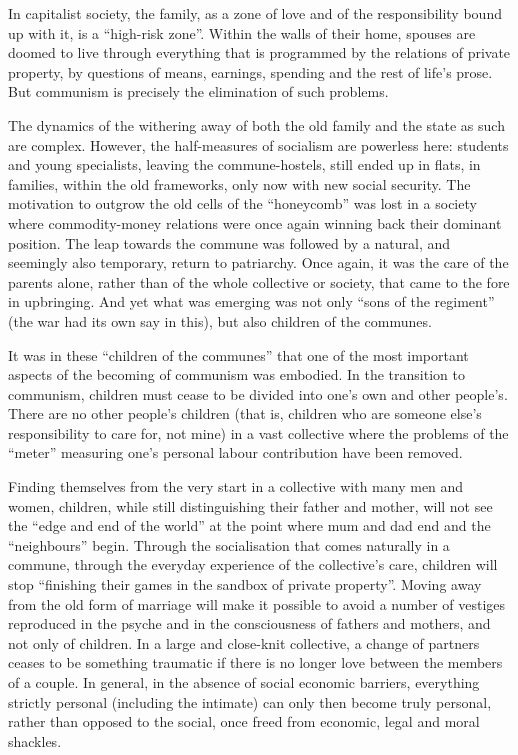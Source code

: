 \documentclass[12pt,a4paper,openany]{book}
\begin{document}
In capitalist society, the family, as a zone of love and of the responsibility bound up with it, is a “high-risk zone”. Within the walls of their home, spouses are doomed to live through everything that is programmed by the relations of private property, by questions of means, earnings, spending and the rest of life’s prose. But communism is precisely the elimination of such problems.

The dynamics of the withering away of both the old family and the state as such are complex. However, the half-measures of socialism are powerless here: students and young specialists, leaving the commune-hostels, still ended up in flats, in families, within the old frameworks, only now with new social security. The motivation to outgrow the old cells of the “honeycomb” was lost in a society where commodity-money relations were once again winning back their dominant position. The leap towards the commune was followed by a natural, and seemingly also temporary, return to patriarchy. Once again, it was the care of the parents alone, rather than of the whole collective or society, that came to the fore in upbringing. And yet what was emerging was not only “sons of the regiment” (the war had its own say in this), but also children of the communes.

It was in these “children of the communes” that one of the most important aspects of the becoming of communism was embodied. In the transition to communism, children must cease to be divided into one’s own and other people’s. There are no other people’s children (that is, children who are someone else’s responsibility to care for, not mine) in a vast collective where the problems of the “meter” measuring one’s personal labour contribution have been removed.

Finding themselves from the very start in a collective with many men and women, children, while still distinguishing their father and mother, will not see the “edge and end of the world” at the point where mum and dad end and the “neighbours” begin. Through the socialisation that comes naturally in a commune, through the everyday experience of the collective’s care, children will stop “finishing their games in the sandbox of private property”. Moving away from the old form of marriage will make it possible to avoid a number of vestiges reproduced in the psyche and in the consciousness of fathers and mothers, and not only of children. In a large and close-knit collective, a change of partners ceases to be something traumatic if there is no longer love between the members of a couple. In general, in the absence of social economic barriers, everything strictly personal (including the intimate) can only then become truly personal, rather than opposed to the social, once freed from economic, legal and moral shackles.
\end{document}
